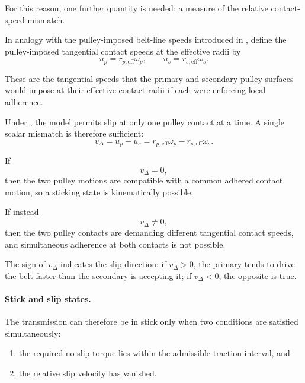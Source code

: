 \documentclass[11pt]{article}
\numberwithin{equation}{section}
\newcounter{assump}
\begin{document}
For this reason, one further quantity is needed: a measure of the relative
contact-speed mismatch.

In analogy with the pulley-imposed belt-line speeds introduced in
, define the pulley-imposed tangential contact
speeds at the effective radii by
\begin{equation}
u_p = r_{p,\mathrm{eff}}\omega_p,
\qquad
u_s = r_{s,\mathrm{eff}}\omega_s.
\label{eq:contact_surface_speeds}
\end{equation}

These are the tangential speeds that the primary and secondary pulley surfaces
would impose at their effective contact radii if each were enforcing local
adherence.

Under , the model permits slip at only one
pulley contact at a time.
A single scalar mismatch is therefore sufficient:
\begin{equation}
v_{\Delta}
=
u_p - u_s
=
r_{p,\mathrm{eff}}\omega_p
-
r_{s,\mathrm{eff}}\omega_s.
\label{eq:v_delta_def}
\end{equation}

If
\begin{equation}
v_{\Delta}=0,
\label{eq:v_delta_zero}
\end{equation}
then the two pulley motions are compatible with a common adhered contact motion,
so a sticking state is kinematically possible.

If instead
\begin{equation}
v_{\Delta}\neq 0,
\label{eq:v_delta_nonzero}
\end{equation}
then the two pulley contacts are demanding different tangential contact speeds,
and simultaneous adherence at both contacts is not possible.

The sign of $v_{\Delta}$ indicates the slip direction:
if $v_{\Delta}>0$, the primary tends to drive the belt faster than the secondary
is accepting it; if $v_{\Delta}<0$, the opposite is true.

\paragraph{Stick and slip states.}

The transmission can therefore be in stick only when two conditions are
satisfied simultaneously:

\begin{enumerate}
    \item the required no-slip torque lies within the admissible traction
    interval, and
    \item the relative slip velocity has vanished.
\end{enumerate}
\end{document}
